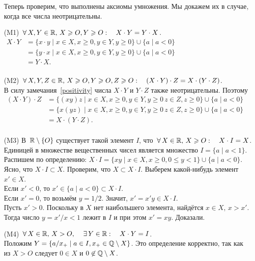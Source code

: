 \documentclass[a4paper,12pt]{article}
\begin{document}
Теперь проверим, что выполнены аксиомы умножения. Мы докажем их в случае, когда все числа неотрицательны.
\begin{items}{-3}
\item[(M1)]
$\,\forall\, X,Y\in \mathbb{R},\,X\geqslant O, Y\geqslant O:\quad X\cdot Y = Y\cdot X$.\\
$
\begin{aligned}
X \cdot Y &= \{x \cdot y \mid x\in X, x \ge 0, y\in Y, y\ge 0\} \cup \{a \mid a<0\}\\
&= \{y \cdot x \mid x\in X, x \ge 0, y\in Y, y\ge 0\} \cup \{a \mid a<0\}\\
&= Y \cdot X.\\
\end{aligned}
$
\item[(M2)]
$\,\forall\, X,Y,Z\in \mathbb{R},\,X\geqslant O, Y\geqslant O, Z\geqslant O:\quad (X\cdot Y)\cdot Z=X\cdot (Y\cdot Z)$.\\
В силу замечания~\ref{positivity} числа $X\cdot Y$ и $Y\cdot Z$ также неотрицательны. Поэтому\\
$
\begin{aligned}
(X\cdot Y)\cdot Z &= \{(xy)z \mid x\in X, x \ge 0, y\in Y, y\ge 0\, z\in Z, z\ge 0\} \cup \{a \mid a<0\}\\
&= \{x(yz) \mid x\in X, x \ge 0, y\in Y, y\ge 0\, z\in Z, z\ge 0\} \cup \{a \mid a<0\}\\
&= X\cdot (Y\cdot Z).\\
\end{aligned}
$
\item[(M3)]
В~$\mathbb{R}\setminus\{O\}$ существует такой элемент $I$, что $\,\forall\, X\in \mathbb{R},\,X\geqslant O:\quad X\cdot I=X$.\\
Единицей в множестве вещественных чисел является множество $I = \{a \mid a < 1\}$. Распишем по определению: $X \cdot I = \{xy\mid x\in X, x \ge 0, 0\le y < 1\}\cup \{a \mid a<0\}$. Ясно, что $X\cdot I \subset X$. Проверим, что $X \subset X\cdot I$. Выберем какой-нибудь элемент $x' \in X$.\\
Если $x' < 0$, то $x' \in \{a \mid a<0\} \subset X \cdot I$.\\
Если $x' = 0$, то возьмём $y = 1/2$. Значит, $x' = x'y \in X \cdot I$.\\
Пусть $x' > 0$. Поскольку в $X$ нет наибольшего элемента, найдётся $x \in X$, $x > x'$. Тогда число $y = x'/x < 1$ лежит в $I$ и при этом $x' = xy$. Доказали.
\item[(M4)]
$\,\forall\, X \in \mathbb{R},\,X > O,\quad\,\exists\, Y\in \mathbb{R}:\quad X\cdot Y=I$.\\
Положим $Y = \{a / x_+ \mid a \in I, x_+\in\mathbb{Q}\setminus X\}$. Это определение корректно, так как из $X > O$ следует $0 \in X$ и $0 \not\in \mathbb{Q}\setminus X$.

\end{items}
\end{document}
